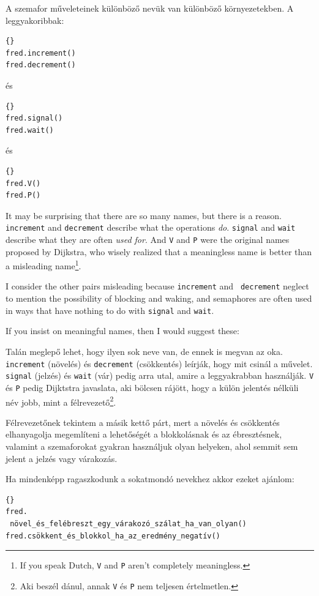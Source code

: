 \documentclass{book}
\begin{document}
A szemafor műveleteinek különböző nevük van különböző
környezetekben. A leggyakoribbak:
%
\begin{lstlisting}[title={Szemafor műveletek}]{}
fred.increment()
fred.decrement()	
\end{lstlisting}
%
és
%
\begin{lstlisting}[title={Szemafor műveletek}]{}
fred.signal()
fred.wait()	
\end{lstlisting}
%
és
%
\begin{lstlisting}[title={Szemafor műveletek}]{}
fred.V()
fred.P()	
\end{lstlisting}
%
It may be surprising that there are so many names, but there is a
reason.  {\tt increment} and {\tt decrement}
describe what the operations {\em do}.  {\tt signal} and {\tt wait}
describe what they are often {\em used for}.  And {\tt V} and {\tt P} were
the original names proposed by Dijkstra, who wisely realized that a
meaningless name is better than a misleading name\footnote{If you speak
Dutch, {\tt V} and {\tt P} aren't completely meaningless.}.

I consider the other pairs misleading because {\tt increment} and {\tt
decrement} neglect to mention the possibility of blocking and waking,
and semaphores are often used in ways that have nothing to do with
{\tt signal} and {\tt wait}.

If you insist on meaningful names, then I would suggest these:

Talán meglepő lehet, hogy ilyen sok neve van, de ennek is megvan
az oka. {\tt increment} (növelés) és {\tt decrement} (csökkentés) leírják, hogy
mit csinál a művelet. {\tt signal} (jelzés) és {\tt wait} (vár) pedig
arra utal, amire a leggyakrabban használják. {\tt V} és {\tt P} pedig Dijktstra
javaslata, aki bölcsen rájött, hogy a külön jelentés nélküli
név jobb, mint a félrevezető\footnote{Aki beszél dánul, annak {\tt V} és {\tt P}
nem teljesen értelmetlen.}.

Félrevezetőnek tekintem a másik
kettő párt, mert a növelés és csökkentés elhanyagolja megemlíteni
a lehetőségét a blokkolásnak és az ébresztésnek, valamint a szemaforokat
gyakran használjuk olyan helyeken, ahol semmit sem jelent a jelzés
vagy várakozás.

Ha mindenképp ragaszkodunk a sokatmondó nevekhez akkor
ezeket ajánlom:

\begin{lstlisting}[title={Sokatmondó szemafor műveletek}]{}
fred.
 növel_és_felébreszt_egy_várakozó_szálat_ha_van_olyan()
fred.csökkent_és_blokkol_ha_az_eredmény_negatív()	
\end{lstlisting}
\end{document}
